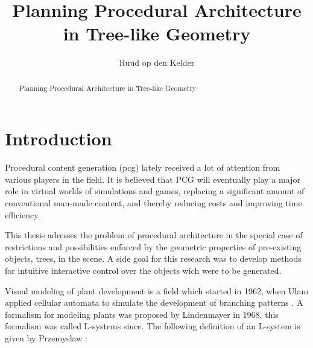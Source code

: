 \documentclass{article}
\title{Planning Procedural Architecture in Tree-like Geometry}
\author{Ruud op den Kelder}
\begin{document}
\maketitle

\begin{abstract}
Planning Procedural Architecture in Tree-like Geometry
\end{abstract}
\newpage 

\tableofcontents
\newpage 

\section{Introduction}
\label{sec:intro}

Procedural content generation (pcg) lately received a lot of attention from various players in the field. It is believed that PCG will eventually play a major role in virtual worlds of simulations and games, replacing a significant amount of conventional man-made content, and thereby reducing costs and improving time efficiency.  

This thesis adresses the problem of procedural architecture in the special case of restrictions and possibilities enforced by the geometric properties of pre-existing objects, trees, in the scene. A side goal for this research was to develop methods for intuitive interactive control over the objects wich were to be generated. 



Visual modeling of plant development is a field which started in 1962, when Ulam applied cellular automata to 
simulate the development of branching patterns \cite{PrzemyslawPlants}. A formalism for modeling plants was proposed by Lindenmayer 
in 1968, this formalism was called L-systems since. The following definition of an L-system is given by Przemyslaw \cite{PrzemyslawPlants}: 
\end{document}
